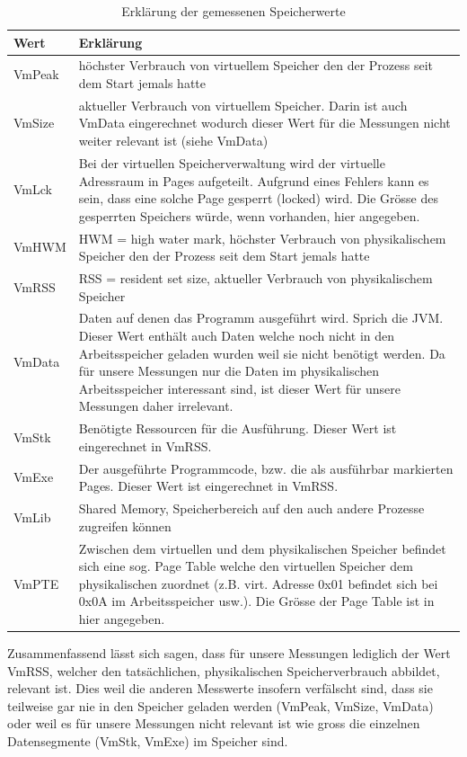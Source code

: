 \documentclass{fancydocument}
\begin{document}
\begin{table}[ht!]
\begin{tabular}[c]{|l|p{13cm}|} \hline
\textbf{Wert} & \textbf{Erklärung}\\
\hline
VmPeak & höchster Verbrauch von virtuellem Speicher den der Prozess seit dem Start jemals hatte\\
\hline
VmSize & aktueller Verbrauch von virtuellem Speicher. Darin ist auch VmData eingerechnet wodurch dieser Wert für die Messungen nicht weiter relevant ist (siehe VmData)\\
\hline
VmLck & Bei der virtuellen Speicherverwaltung wird der virtuelle Adressraum in Pages aufgeteilt. Aufgrund eines Fehlers kann es sein, dass eine solche Page gesperrt (locked) wird. Die Grösse des gesperrten Speichers würde, wenn vorhanden, hier angegeben.\\
\hline
VmHWM & HWM = high water mark, höchster Verbrauch von physikalischem Speicher den der Prozess seit dem Start jemals hatte\\
\hline
VmRSS & RSS = resident set size, aktueller Verbrauch von physikalischem Speicher\\
\hline
VmData & Daten auf denen das Programm ausgeführt wird. Sprich die JVM. Dieser Wert enthält auch Daten welche noch nicht in den Arbeitsspeicher geladen wurden weil sie nicht benötigt werden. Da für unsere Messungen nur die Daten im physikalischen Arbeitsspeicher interessant sind, ist dieser Wert für unsere Messungen daher irrelevant.\\
\hline
VmStk & Benötigte Ressourcen für die Ausführung. Dieser Wert ist eingerechnet in VmRSS.\\
\hline
VmExe & Der ausgeführte Programmcode, bzw. die als ausführbar markierten Pages. Dieser Wert ist eingerechnet in VmRSS.\\
\hline
VmLib & Shared Memory, Speicherbereich auf den auch andere Prozesse zugreifen können\\
\hline
VmPTE & Zwischen dem virtuellen und dem physikalischen Speicher befindet sich eine sog. Page Table welche den virtuellen Speicher dem physikalischen zuordnet  (z.B. virt. Adresse 0x01 befindet sich bei 0x0A im Arbeitsspeicher usw.). Die Grösse der Page Table ist in hier angegeben. \\
\hline							
\end{tabular}
\caption{Erklärung der gemessenen Speicherwerte}
\end{table}
\newpage
Zusammenfassend lässt sich sagen, dass für unsere Messungen lediglich der Wert VmRSS, welcher den tatsächlichen, physikalischen Speicherverbrauch abbildet, relevant ist. Dies weil die anderen Messwerte insofern verfälscht sind, dass sie teilweise gar nie in den Speicher geladen werden (VmPeak, VmSize, VmData) oder weil es für unsere Messungen nicht relevant ist wie gross die einzelnen Datensegmente (VmStk, VmExe) im Speicher sind.
\end{document}
